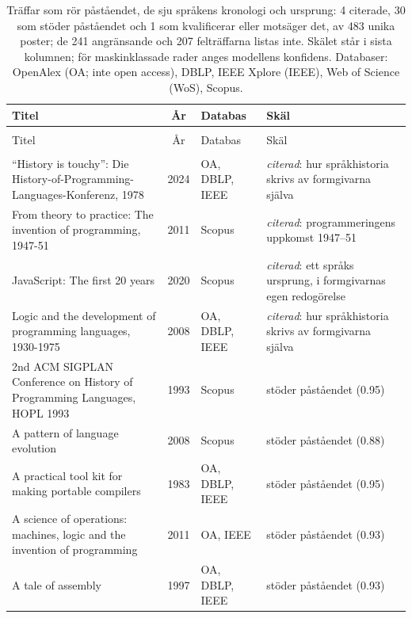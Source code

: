 \begingroup\footnotesize
\begin{longtable}{@{}%
  >{\raggedright\arraybackslash}p{}c%
  >{\raggedright\arraybackslash}p{}%
  >{\raggedright\arraybackslash}p{}@{}}
\caption{Träffar som rör påståendet, de sju språkens kronologi och ursprung: 4 citerade, 30 som stöder påståendet och 1 som kvalificerar eller motsäger det, av 483 unika poster; de 241 angränsande och 207 felträffarna listas inte.  Skälet står i sista kolumnen; för maskinklassade rader anges modellens konfidens.  Databaser: OpenAlex (OA; inte \foreignlanguage{english}{open access}), DBLP, IEEE Xplore (IEEE), Web of Science (WoS), Scopus.}\label{tab:sok-sprak}\\
\toprule
Titel & År & Databas & Skäl \\
\midrule
\endfirsthead
\multicolumn{4}{@{}l}{\emph{\tablename~\thetable{} (\GetTranslation{continued})}}\\
\toprule Titel & År & Databas & Skäl \\ \midrule
\endhead
\midrule \multicolumn{4}{r@{}}{\emph{\GetTranslation{continued on the next page}}}\\
\endfoot
\bottomrule
\endlastfoot
``History is touchy'': Die History-of-Programming-Languages-Konferenz, 1978 & 2024 & OA, DBLP, IEEE & \emph{citerad}: hur språkhistoria skrivs av formgivarna själva \\
From theory to practice: The invention of programming, 1947-51 & 2011 & Scopus & \emph{citerad}: programmeringens uppkomst 1947--51 \\
JavaScript: The first 20 years & 2020 & Scopus & \emph{citerad}: ett språks ursprung, i formgivarnas egen redogörelse \\
Logic and the development of programming languages, 1930-1975 & 2008 & OA, DBLP, IEEE & \emph{citerad}: hur språkhistoria skrivs av formgivarna själva \\
2nd ACM SIGPLAN Conference on History of Programming Languages, HOPL 1993 & 1993 & Scopus & stöder påståendet (0.95) \\
A pattern of language evolution & 2008 & Scopus & stöder påståendet (0.88) \\
A practical tool kit for making portable compilers & 1983 & OA, DBLP, IEEE & stöder påståendet (0.95) \\
A science of operations: machines, logic and the invention of programming & 2011 & OA, IEEE & stöder påståendet (0.93) \\
A tale of assembly & 1997 & OA, DBLP, IEEE & stöder påståendet (0.93) \\

\end{longtable}
